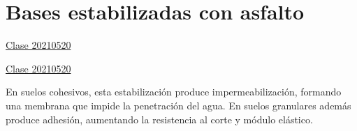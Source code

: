 \documentclass[../main.tex]{subfiles}
\begin{document}
\section{Bases estabilizadas con asfalto}

\href{https://www.youtube.com/watch?v=u34j20Z4YGw&list=PLoCwJEKoNRRQLdfQELZOWr8wfhYz4d-UH&index=8}{Clase 20210520}

\href{https://www.youtube.com/watch?v=RRnzHTi_0_w&list=PLoCwJEKoNRRQLdfQELZOWr8wfhYz4d-UH&index=9}{Clase 20210520}

En suelos cohesivos, esta estabilización produce impermeabilización, formando una
membrana que impide la penetración del agua. En suelos granulares además produce
adhesión, aumentando la resistencia al corte y módulo elástico.
\end{document}
